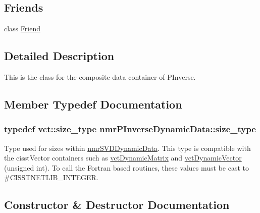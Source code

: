 \subsection*{Friends}
\begin{DoxyCompactItemize}
\item 
class \hyperlink{classnmr_p_inverse_dynamic_data_a7f8321d57e81bc613d5dbef3410ba70e}{Friend}
\end{DoxyCompactItemize}


\subsection{Detailed Description}
This is the class for the composite data container of P\+Inverse. 

\subsection{Member Typedef Documentation}
\hypertarget{classnmr_p_inverse_dynamic_data_a059041cc0fb800515bffe5bb351b01cb}{}
\subsubsection[{size\+\_\+type}]{\setlength{\rightskip}{0pt plus 5cm}typedef {\bf vct\+::size\+\_\+type} {\bf nmr\+P\+Inverse\+Dynamic\+Data\+::size\+\_\+type}}\label{classnmr_p_inverse_dynamic_data_a059041cc0fb800515bffe5bb351b01cb}
Type used for sizes within \hyperlink{classnmr_s_v_d_dynamic_data}{nmr\+S\+V\+D\+Dynamic\+Data}. This type is compatible with the cisst\+Vector containers such as \hyperlink{classvct_dynamic_matrix}{vct\+Dynamic\+Matrix} and \hyperlink{classvct_dynamic_vector}{vct\+Dynamic\+Vector} (unsigned int). To call the Fortran based routines, these values must be cast to \#\+C\+I\+S\+S\+T\+N\+E\+T\+L\+I\+B\+\_\+\+I\+N\+T\+E\+G\+E\+R. 

\subsection{Constructor \& Destructor Documentation}
\hypertarget{classnmr_p_inverse_dynamic_data_a3855d7122f40063562732a47c3674584}{}
